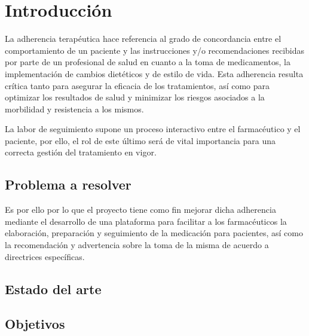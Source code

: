 \chapter{Introducción}

La adherencia terapéutica hace referencia al grado de concordancia entre el comportamiento de un paciente y las instrucciones y/o recomendaciones recibidas por parte de un profesional de salud en cuanto a la toma de medicamentos, la implementación de cambios dietéticos y de estilo de vida. Esta adherencia resulta crítica tanto para asegurar la eficacia de los tratamientos, así como para optimizar los resultados de salud y minimizar los riesgos asociados a la morbilidad y resistencia a los mismos. 

La labor de seguimiento supone un proceso interactivo entre el farmacéutico y el paciente, por ello, el rol de este último será de vital importancia para una correcta gestión del tratamiento en vigor.



 \cite{pages2018metodos}

\section{Problema a resolver}



Es por ello por lo que el proyecto tiene como fin mejorar dicha adherencia mediante el desarrollo de una plataforma para facilitar a los farmacéuticos la elaboración, preparación y seguimiento de la medicación para pacientes, así como la recomendación y advertencia sobre la toma de la misma de acuerdo a directrices específicas. 



\section{Estado del arte}

\section{Objetivos}
